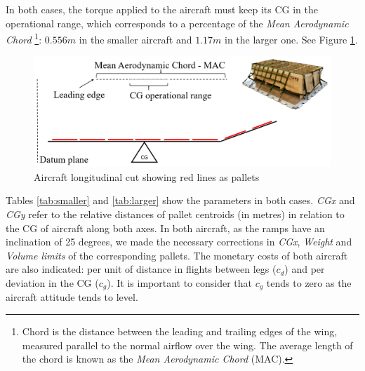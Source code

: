 \documentclass[preprint,authoryear]{elsarticle}
\begin{document}
In both cases, the torque applied to the aircraft must keep its CG in the operational range, which corresponds to a percentage of the {\it Mean Aerodynamic Chord} \footnote{Chord is the distance between the leading and trailing edges of the wing, measured parallel to the normal airflow over the wing. The average length of the chord is known as the {\it Mean Aerodynamic Chord} (MAC).}: $0.556m$ in the smaller aircraft and $1.17m$ in the larger one. See Figure \ref{fig:lateral}.

\begin{figure}[H]
	\centering
	\includegraphics[scale=0.22]{Images/lateral.png}
	\caption{Aircraft longitudinal cut showing red lines as pallets}
	\label{fig:lateral}
\end{figure}



Tables \ref{tab:smaller} and \ref{tab:larger} show the parameters in both cases. {\it CGx} and {\it CGy} refer to the relative distances of pallet centroids (in metres) in relation to the CG of aircraft along both axes. In both aircraft, as the ramps have an inclination of 25 degrees, we made the necessary corrections in {\it CGx}, {\it Weight} and {\it Volume limits} of the corresponding pallets. The monetary costs of both aircraft are also indicated: per unit of distance in flights between legs ($c_d$) and per deviation in the CG ($c_g$). It is important to consider that $c_g$ tends to zero as the aircraft attitude tends to level.
\end{document}

